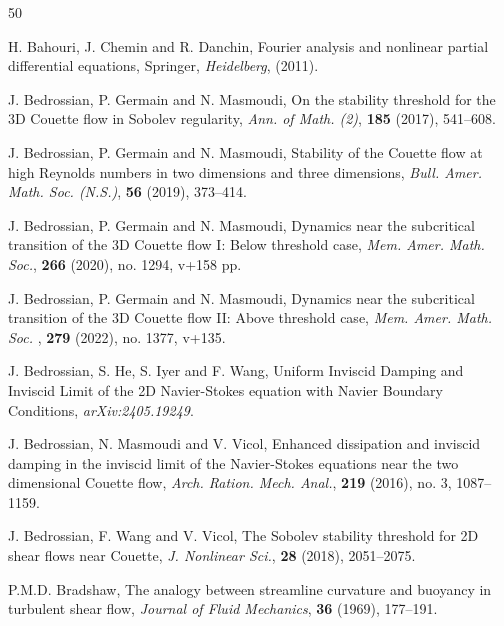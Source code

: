 \documentclass[11pt,reqno]{article}
\numberwithin{equation}{section}
\begin{document}
\begin{thebibliography}{50}
\normalfont

H. Bahouri, J. Chemin and R. Danchin,
Fourier analysis and nonlinear partial differential equations, Springer, \textit{Heidelberg}, (2011).


J. Bedrossian, P. Germain and N. Masmoudi, 
On the stability threshold for the 3D Couette flow in Sobolev regularity,
\textit{Ann. of Math. (2)}, \textbf{185} (2017), 541--608.




J. Bedrossian, P. Germain and N. Masmoudi, 
Stability of the Couette flow at high Reynolds numbers in two dimensions and three dimensions,
\textit{Bull. Amer. Math. Soc. (N.S.)}, \textbf{56} (2019),  373--414.



J. Bedrossian, P. Germain and N. Masmoudi,
Dynamics near the subcritical transition of the 3D Couette flow I: Below threshold case,
\textit{Mem. Amer. Math. Soc.}, \textbf{266} (2020), no. 1294, v+158 pp.


 	J. Bedrossian, P. Germain and N. Masmoudi, Dynamics near the subcritical transition of the 3D Couette flow II: Above threshold case, \textit{Mem. Amer. Math. Soc. }, \textbf{279} (2022), no. 1377, v+135.



 	J. Bedrossian, S. He, S. Iyer and F. Wang, Uniform Inviscid Damping and Inviscid Limit of the 2D Navier-Stokes equation with Navier Boundary Conditions, \textit{arXiv:2405.19249}.		

J. Bedrossian, N. Masmoudi and V. Vicol, 
Enhanced dissipation and inviscid damping in the inviscid limit of the Navier-Stokes equations near the two dimensional Couette flow,
\textit{Arch. Ration. Mech. Anal.}, \textbf{219} (2016), no. 3, 1087--1159.

	J. Bedrossian, F. Wang and V. Vicol, The Sobolev stability threshold for 2D shear flows near Couette, \textit{J.
	Nonlinear Sci.}, \textbf{28} (2018), 2051--2075.	

P.M.D. Bradshaw, 
The analogy between streamline curvature and buoyancy in turbulent shear flow, 
\textit{Journal of Fluid Mechanics}, \textbf{36} (1969), 177--191.






\end{thebibliography}
\end{document}
